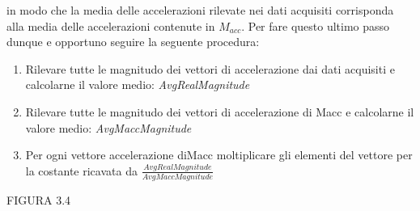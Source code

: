 in modo che la media delle accelerazioni rilevate nei dati acquisiti corrisponda
alla media delle accelerazioni contenute in $M_{acc}$. Per fare questo ultimo passo
dunque e opportuno seguire la seguente procedura:
\begin{enumerate}
\item Rilevare tutte le magnitudo dei vettori di accelerazione dai dati acquisiti
e calcolarne il valore medio: \textit{AvgRealMagnitude}
\item Rilevare tutte le magnitudo dei vettori di accelerazione di Macc e calcolarne
il valore medio: \textit{AvgMaccMagnitude}
\item Per ogni vettore accelerazione diMacc moltiplicare gli elementi del vettore
per la costante ricavata da $\frac{AvgRealMagnitude}{AvgMaccMagnitude}$
\end{enumerate}
FIGURA 3.4


